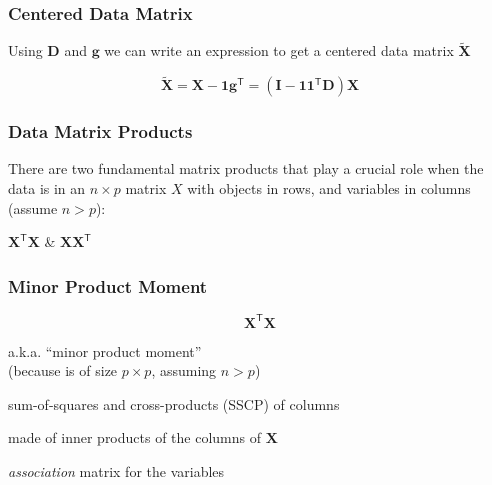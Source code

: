 \documentclass[12pt]{beamer}\usepackage[]{graphicx}\usepackage[]{color}
\begin{document}

\begin{frame}
\frametitle{Centered Data Matrix}

Using $\mathbf{D}$ and $\mathbf{g}$ we can write an expression
to get a centered data matrix $\mathbf{\tilde{X}}$

$$
\mathbf{\tilde{X}} = \mathbf{X - 1 g^\mathsf{T}} = (\mathbf{I - 1 1^\mathsf{T} D}) \mathbf{X}
$$

\end{frame}


\begin{frame}
\begin{center}
\Huge{}
\end{center}
\end{frame}


\begin{frame}
\frametitle{Data Matrix Products}

There are {\hilit two fundamental matrix products} that play a crucial role when the data 
is in an $n \times p$ matrix $X$ with objects in rows, and variables in columns 
(assume $n > p$):

\bigskip
{\Large
\centerline{$\mathbf{X^\mathsf{T} X}$ \quad \& \quad $\mathbf{X X^\mathsf{T}}$}
}

\end{frame}


\begin{frame}
\frametitle{Minor Product Moment}

{\Large
$$
\mathbf{X^\mathsf{T} X}
$$ 
}

\bi
  \item a.k.a. ``minor product moment'' \\
  {\lolit (because is of size $p \times p$, assuming $n > p$)}
  \item sum-of-squares and cross-products (SSCP) of columns
  \item made of inner products of the columns of $\mathbf{X}$
  \item \textit{association} matrix for the variables
\ei

\end{frame}

\end{document}
